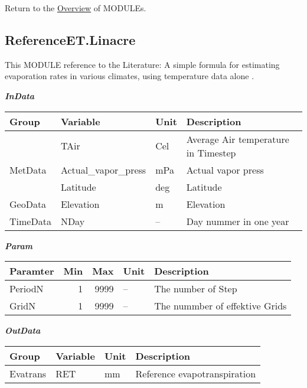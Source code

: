 \documentclass[
]{book}
\begin{document}
Return to the \protect\hyperlink{module}{Overview} of MODULEs.

\hypertarget{ReferenceET.Linacre}{%
\subsection{ReferenceET.Linacre}\label{ReferenceET.Linacre}}

This MODULE reference to the Literature: A simple formula for estimating evaporation rates in various climates, using temperature data alone \citep{Linacre.1977}.

\textbf{\emph{InData}}

\begin{table}[!h]
\centering
\begin{tabular}{l|l|l|l}
\hline
Group & Variable & Unit & Description\\
\hline
 & TAir & Cel & Average Air temperature in Timestep\\
\cline{2-4}
\multirow{-2}{*}{\raggedright\arraybackslash MetData} & Actual\_vapor\_press & mPa & Actual vapor press\\
\cline{1-4}
 & Latitude & deg & Latitude\\
\cline{2-4}
\multirow{-2}{*}{\raggedright\arraybackslash GeoData} & Elevation & m & Elevation\\
\cline{1-4}
TimeData & NDay & -- & Day nummer in one year\\
\hline
\end{tabular}
\end{table}

\textbf{\emph{Param}}

\begin{table}[!h]
\centering
\begin{tabular}{l|r|r|l|l}
\hline
Paramter & Min & Max & Unit & Description\\
\hline
PeriodN & 1 & 9999 & -- & The number of Step\\
\cline{1-5}
GridN & 1 & 9999 & -- & The nummber of effektive Grids\\
\hline
\end{tabular}
\end{table}

\textbf{\emph{OutData}}

\begin{table}[!h]
\centering
\begin{tabular}{l|l|l|l}
\hline
Group & Variable & Unit & Description\\
\hline
Evatrans & RET & mm & Reference evapotranspiration\\
\hline
\end{tabular}
\end{table}
\end{document}
